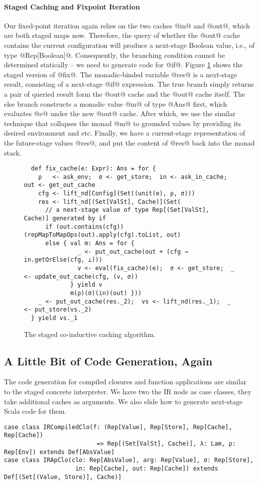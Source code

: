 \paragraph{Staged Caching and Fixpoint Iteration} Our fixed-point iteration
again relies on the two caches @in@ and @out@, which are both staged maps now.
Therefore, the query of whether the @out@ cache contains the current
configuration will produce a next-stage Boolean value, i.e., of type
@Rep[Boolean]@. Consequently, the branching condition cannot be determined
statically -- we need to generate code for @if@. Figure
\ref{fig:staged_coind_cache} shows the staged version of @fix@. The
monadic-binded variable @res@ is a next-stage result, consisting of a next-stage
@if@ expression. The true branch simply returns a pair of queried result form
the @out@ cache and the @out@ cache itself. The else branch constructs a monadic
value @m@ of type @Ans@ first, which evaluates @e@ under the new @out@ cache.
After which, we use the similar technique that collapses the monad @m@ to
grounded values by providing its desired environment and etc. Finally, we have a
current-stage representation of the future-stage values @res@, and put the
content of @res@ back into the monad stack.

\begin{figure}[h!]
\centering
\begin{lstlisting}
  def fix_cache(e: Expr): Ans = for {
    ρ   <- ask_env;  σ <- get_store;  in <- ask_in_cache;  out <- get_out_cache
    cfg <- lift_nd[Config](Set((unit(e), ρ, σ)))
    res <- lift_nd[(Set[ValSt], Cache)](Set(
      // a next-stage value of type Rep[(Set[ValSt], Cache)] generated by if
      if (out.contains(cfg)) (repMapToMapOps(out).apply(cfg).toList, out)
      else { val m: Ans = for {
               _ <- put_out_cache(out + (cfg → in.getOrElse(cfg, ⊥)))
               v <- eval(fix_cache)(e);  σ <- get_store;  _ <- update_out_cache(cfg, (v, σ))
             } yield v
             m(ρ)(σ)(in)(out) }))
    _ <- put_out_cache(res._2);  vs <- lift_nd(res._1);  _ <- put_store(vs._2)
  } yield vs._1
\end{lstlisting}
\caption{The staged co-inductive caching algorithm.}
\label{fig:staged_coind_cache}
\vspace{-2em}
\end{figure}

\subsection{A Little Bit of Code Generation, Again}
The code generation for compiled closures and function applications are similar
to the staged concrete interpreter. We have two the IR node as case classes, they
take additional caches as arguments. We also elide how to generate next-stage Scala
code for them.
\begin{lstlisting}
case class IRCompiledClo(f: (Rep[Value], Rep[Store], Rep[Cache], Rep[Cache])
                          => Rep[(Set[ValSt], Cache)], λ: Lam, ρ: Rep[Env]) extends Def[AbsValue]
case class IRApClo(clo: Rep[AbsValue], arg: Rep[Value], σ: Rep[Store],
                    in: Rep[Cache], out: Rep[Cache]) extends Def[(Set[(Value, Store)], Cache)]
\end{lstlisting}

